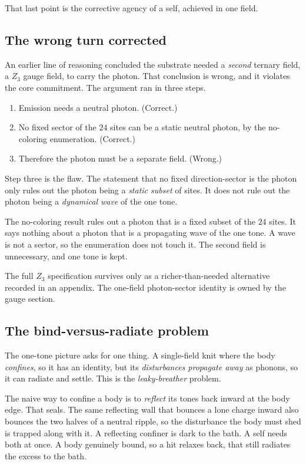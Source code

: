 That last point is the corrective agency of a self, achieved in one field.

\subsection{The wrong turn corrected}

An earlier line of reasoning concluded the substrate needed a \emph{second} ternary field, a $Z_3$ gauge field,
to carry the photon. That conclusion is wrong, and it violates the core commitment. The argument ran in three
steps.

\begin{enumerate}
\item Emission needs a neutral photon. (Correct.)
\item No fixed sector of the $24$ sites can be a static neutral photon, by the no-coloring enumeration.
(Correct.)
\item Therefore the photon must be a separate field. (Wrong.)
\end{enumerate}

Step three is the flaw. The statement that no fixed direction-sector is the photon only rules out the photon
being a \emph{static subset} of sites. It does not rule out the photon being a \emph{dynamical wave} of the one
tone.

\begin{result}
The no-coloring result rules out a photon that is a fixed subset of the $24$ sites. It says nothing about a
photon that is a propagating wave of the one tone. A wave is not a sector, so the enumeration does not touch it.
The second field is unnecessary, and one tone is kept.
\end{result}

The full $Z_3$ specification survives only as a richer-than-needed alternative recorded in an appendix. The
one-field photon-sector identity is owned by the gauge section.

\subsection{The bind-versus-radiate problem}

The one-tone picture asks for one thing. A single-field knit where the body \emph{confines}, so it has an
identity, but its \emph{disturbances propagate away} as phonons, so it can radiate and settle. This is the
\emph{leaky-breather} problem.

The naive way to confine a body is to \emph{reflect} its tones back inward at the body edge. That seals. The same
reflecting wall that bounces a lone charge inward also bounces the two halves of a neutral ripple, so the
disturbance the body must shed is trapped along with it. A reflecting confiner is dark to the bath. A self needs
both at once. A body genuinely bound, so a hit relaxes back, that still radiates the excess to the bath.

